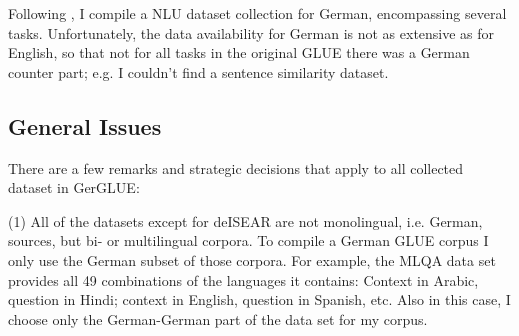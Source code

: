 Following \cite{wang2018glue}, I compile a NLU dataset collection for German, encompassing several
tasks. Unfortunately, the data availability for German is not as extensive as for English, so that
not for all tasks in the original GLUE there was a German counter part; e.g. I couldn't find a sentence
similarity dataset.


\subsection{General Issues}

There are a few remarks and strategic decisions that apply to all collected dataset in GerGLUE:

(1) All of the datasets except for deISEAR are not monolingual, i.e. German, sources, but bi-
or multilingual corpora. To compile a German GLUE corpus I only use the German subset of
those corpora. For example, the MLQA data set provides all 49 combinations of the languages
it contains: Context in Arabic, question in Hindi; context in English, question in Spanish,
etc. Also in this case, I choose only the German-German part of the data set for my corpus.


